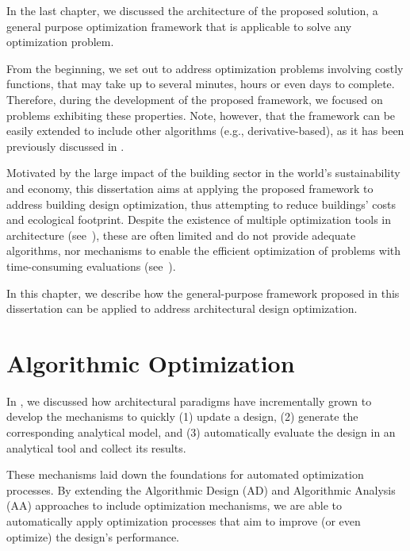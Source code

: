 \cleardoublepage
\label{chap:implement}

In the last chapter, we discussed the architecture of the proposed solution, a general purpose optimization framework that is applicable to solve any optimization problem. 

From the beginning, we set out to address optimization problems involving costly functions, that may take up to several minutes, hours or even days to complete. Therefore, during the development of the proposed framework, we focused on problems exhibiting these properties. Note, however, that the framework can be easily extended to include other algorithms (e.g., derivative-based), as it has been previously discussed in . 

Motivated by the large impact of the building sector in the world's sustainability and economy, this dissertation aims at applying the proposed framework to address building design optimization, thus attempting to reduce buildings' costs and ecological footprint. Despite the existence of multiple optimization tools in architecture (see~), these are often limited and do not provide adequate algorithms, nor mechanisms to enable the efficient optimization of problems with time-consuming evaluations (see~).

In this chapter, we describe how the general-purpose framework proposed in this dissertation can be applied to address architectural design optimization. 

\section{Algorithmic Optimization}

In , we discussed how architectural paradigms have incrementally grown to develop the mechanisms to quickly (1) update a design, (2) generate the corresponding analytical model, and (3) automatically evaluate the design in an analytical tool and collect its results. 

These mechanisms laid down the foundations for automated optimization processes. By extending the Algorithmic Design (AD) and Algorithmic Analysis (AA) approaches to include optimization mechanisms, we are able to automatically apply optimization processes that aim to improve (or even optimize) the design’s performance. 

